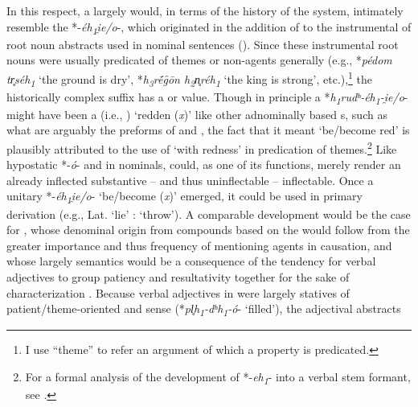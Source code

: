 \documentclass[output=paper,colorlinks,citecolor=brown]{langscibook}
\begin{document}
In this respect, a largely   would, in terms of the history of the   system, intimately resemble the  *-\textit{éh\textsubscript{1}i̯e/o}-, which originated in the addition of  to the instrumental of root noun abstracts used in nominal sentences (\citealt[147]{Jasanoff2004}). Since these instrumental root nouns were usually predicated of themes or non-agents generally (e.g., \mbox{*\textit{pédom}} \textit{tr̥séh\textsubscript{1}}   ‘the ground is dry’, *\textit{h\textsubscript{3}rḗg̑ōn h\textsubscript{2}n̥réh\textsubscript{1}}  ‘the king is strong’, etc.),\footnote{I use “theme” to refer an argument of which a property is predicated.} the historically complex suffix has a  or  value. Though in principle a *\textit{h\textsubscript{1}rudʰ-éh\textsubscript{1}-i̯e/o}- might have been a  (i.e., ) ‘redden (\textit{x})’ like other adnominally  based s, such as what are arguably the preforms of  and , the fact that it meant ‘be/become red’ is plausibly attributed to the use of  ‘with redness’ in  predication of themes.\footnote{For a formal analysis of the development of *-\textit{eh\textsubscript{1}}- into a verbal stem formant, see \citealt[15--23]{Grestenberger2023}.} Like hypostatic *-\textit{ó}- and  in nominals,  could, as one of its functions, merely render an already inflected substantive -- and thus uninflectable  -- inflectable. Once a unitary *-\textit{éh\textsubscript{1}i̯e/o}- ‘be/become (\textit{x})’ emerged, it could be used in primary derivation (e.g., Lat.  ‘lie’ :  ‘throw’). A comparable development would be the case for , whose denominal  origin from compounds based on the    would follow from the greater importance and thus frequency of mentioning agents in causation, and whose largely  semantics would be a consequence of the tendency for verbal adjectives to group patiency and resultativity together for the sake of characterization \citep{Haspelmath1994}. Because verbal adjectives in  were largely statives of patient/theme-oriented and  sense (*\textit{pl̥h\textsubscript{1}-dʰh\textsubscript{1}-ó}- ‘filled’), the adjectival abstracts 
\end{document}
